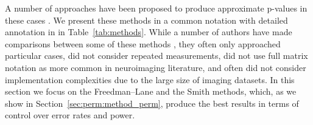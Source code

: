 A number of approaches have been proposed to produce approximate p-values in these cases \citep{Draper1966, Beaton1978, Still1981, Brown1982, Levin1983, Freedman1983, Oja1987, Gail1988, Welch1990, TerBraak1992, Kennedy1995, Edgington1995, Manly1997, Huh2001, Jung2006, Kherad2010}. We present these methods in a common notation with detailed annotation in in Table~\ref{tab:methods}.  While a number of authors have made comparisons between some of these methods \citep{Kennedy1995, Kennedy1996, Gonzalez1998, Anderson1999, Anderson2001, Anderson2003, OGorman2005, Dekker2007, Nichols2008, Ridgway2009}, they often only approached particular cases, did not consider repeated measurements, did not use full matrix notation as more common in neuroimaging literature, and often did not consider implementation complexities due to the large size of imaging datasets. In this section we focus on the Freedman--Lane and the Smith methods, which, as we show in Section~\ref{sec:perm:method_perm}, produce the best results in terms of control over error rates and power.

